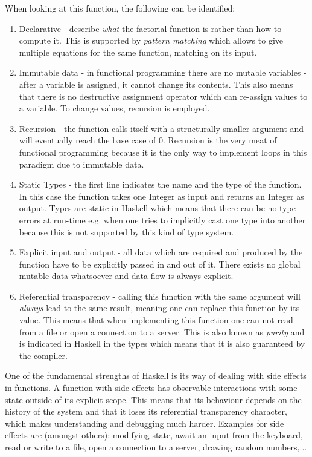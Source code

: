 When looking at this function, the following can be identified: 
\begin{enumerate}
	\item Declarative - describe \textit{what} the factorial function is rather than how to compute it. This is supported by \textit{pattern matching} which allows to give multiple equations for the same function, matching on its input. 
	
	\item Immutable data - in functional programming there are no mutable variables - after a variable is assigned, it cannot change its contents. This also means that there is no destructive assignment operator which can re-assign values to a variable. To change values, recursion is employed.
	
	\item Recursion - the function calls itself with a structurally smaller argument and will eventually reach the base case of 0. Recursion is the very meat of functional programming because it is the only way to implement loops in this paradigm due to immutable data.
	
	\item Static Types - the first line indicates the name and the type of the function. In this case the function takes one Integer as input and returns an Integer as output. Types are static in Haskell which means that there can be no type errors at run-time e.g. when one tries to implicitly cast one type into another because this is not supported by this kind of type system.

	\item Explicit input and output - all data which are required and produced by the function have to be explicitly passed in and out of it. There exists no global mutable data whatsoever and data flow is always explicit.
	
	\item Referential transparency - calling this function with the same argument will \textit{always} lead to the same result, meaning one can replace this function by its value. This means that when implementing this function one can not read from a file or open a connection to a server. This is also known as \textit{purity} and is indicated in Haskell in the types which means that it is also guaranteed by the compiler.
\end{enumerate}

One of the fundamental strengths of Haskell is its way of dealing with side effects in functions. A function with side effects has observable interactions with some state outside of its explicit scope. This means that its behaviour depends on the history of the system and that it loses its referential transparency character, which makes understanding and debugging much harder. Examples for side effects are (amongst others): modifying state, await an input from the keyboard, read or write to a file, open a connection to a server, drawing random numbers,...

